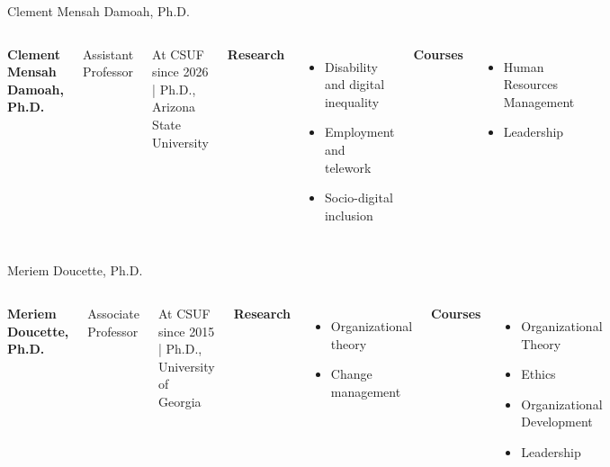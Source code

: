 \documentclass[10pt,aspectratio=169]{beamer}
\begin{document}
\begin{frame}{Clement Mensah Damoah, Ph.D.}
\begin{columns}[T,onlytextwidth]
    \raggedright
    {\large\bfseries Clement Mensah Damoah, Ph.D.}\par
    {Assistant Professor}\par
    {\footnotesize At CSUF since 2026 \quad | \quad Ph.D., Arizona State University}\par\vspace{0.4em}

    \textbf{Research}
    \begin{itemize}
      \item Disability and digital inequality
      \item Employment and telework
      \item Socio-digital inclusion
    \end{itemize}

    \textbf{Courses}
    \begin{itemize}
      \item Human Resources Management
      \item Leadership
    \end{itemize}

    \vspace*{0.25cm}
\end{columns}
\end{frame}

\begin{frame}{Meriem Doucette, Ph.D.}
\begin{columns}[T,onlytextwidth]
    \raggedright
    {\large\bfseries Meriem Doucette, Ph.D.}\par
    {Associate Professor}\par
    {\footnotesize At CSUF since 2015 \quad | \quad Ph.D., University of Georgia}\par\vspace{0.4em}

    \textbf{Research}
    \begin{itemize}
      \item Organizational theory
      \item Change management
    \end{itemize}

    \textbf{Courses}
    \begin{itemize}
      \item Organizational Theory
      \item Ethics
      \item Organizational Development
      \item Leadership
    \end{itemize}

    \vspace*{0.25cm}
\end{columns}
\end{frame}
\end{document}
